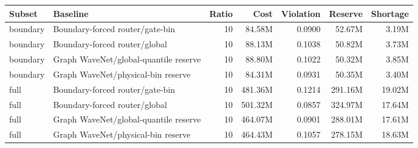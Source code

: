 \begin{tabular}{llrrrrr}
\toprule
Subset & Baseline & Ratio & Cost & Violation & Reserve & Shortage \\
\midrule
boundary & Boundary-forced router/gate-bin & 10 & 84.58M & 0.0900 & 52.67M & 3.19M \\
boundary & Boundary-forced router/global & 10 & 88.13M & 0.1038 & 50.82M & 3.73M \\
boundary & Graph WaveNet/global-quantile reserve & 10 & 88.80M & 0.1022 & 50.32M & 3.85M \\
boundary & Graph WaveNet/physical-bin reserve & 10 & 84.31M & 0.0931 & 50.35M & 3.40M \\
full & Boundary-forced router/gate-bin & 10 & 481.36M & 0.1214 & 291.16M & 19.02M \\
full & Boundary-forced router/global & 10 & 501.32M & 0.0857 & 324.97M & 17.64M \\
full & Graph WaveNet/global-quantile reserve & 10 & 464.07M & 0.0901 & 288.01M & 17.61M \\
full & Graph WaveNet/physical-bin reserve & 10 & 464.43M & 0.1057 & 278.15M & 18.63M \\
\bottomrule
\end{tabular}
